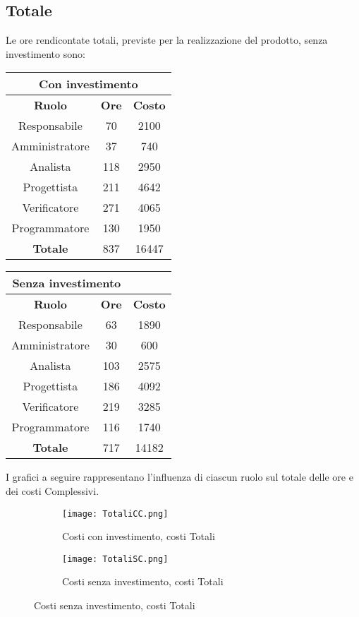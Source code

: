 \documentclass{scalatekids-article}
\begin{document}
\subsection{Totale}
Le ore rendicontate totali, previste per la realizzazione del prodotto, senza
investimento sono:
\begin{center}
  \normalsize
  \begin{tabular}{| c | c | c |}
    \hline
    \multicolumn{3}{|c|}{\textbf{Con investimento}}\\
    \hline
    \textbf{Ruolo} & \textbf{Ore} & \textbf{Costo}\\
    \hline
    Responsabile & 70 & 2100\\
    Amministratore & 37 & 740\\
    Analista & 118 & 2950\\
    Progettista & 211 & 4642\\
    Verificatore & 271 & 4065 \\
    Programmatore & 130 & 1950 \\
    \hline
    \textbf{Totale} & 837 & 16447\\
    \hline
  \end{tabular}
  \qquad
  \begin{tabular}{| c | c | c |}
    \hline
    \multicolumn{2}{|c|}{\textbf{Senza investimento}}\\
    \hline
    \textbf{Ruolo} & \textbf{Ore} & \textbf{Costo}\\
    \hline
    Responsabile & 63 & 1890\\
    Amministratore & 30 & 600\\
    Analista & 103 & 2575\\
    Progettista & 186 & 4092\\
    Verificatore & 219 & 3285\\
    Programmatore & 116 & 1740 \\
    \hline
    \textbf{Totale} & 717 & 14182 \\
    \hline
  \end{tabular}
\end{center}
I grafici a seguire rappresentano l'influenza di ciascun ruolo sul totale delle ore e dei costi Complessivi.
\begin{figure}[H]
  \begin{subfigure}[H]{0.47\textwidth}
    \texttt{[image: TotaliCC.png]}
    \caption{Costi con investimento, costi Totali}
  \end{subfigure}
  \qquad
  \begin{subfigure}[H]{0.47\textwidth}
    \texttt{[image: TotaliSC.png]}
    \caption{Costi senza investimento, costi Totali}
  \end{subfigure}
\end{figure}
\end{document}
